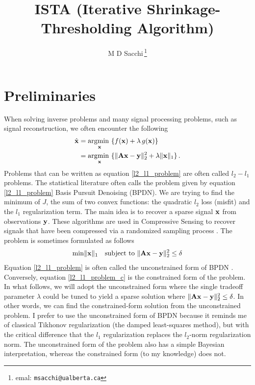 \documentclass[11pt, oneside]{article}  	%
\title{ISTA (Iterative Shrinkage-Thresholding Algorithm) }
\author{M D Sacchi\,\footnote{emal: \texttt{msacchi@ualberta.ca}} }
\date{}
\def\be{\vspace{0.0cm}\begin{equation}}
\def\ee{\vspace{0.0cm}\end{equation}}
\def\nin{\noindent}
\begin{document}
\maketitle

\section{Preliminaries}
When solving inverse problems and many signal processing problems, such as signal reconstruction, we often encounter the following 
\begin{align}
\hat{{\bf x }} &= \underset{{\bf x}}{\mbox{argmin }} \{ f({\bf x}) + \lambda\, g({\bf x}) \} \nonumber\\
      &= \underset{{\bf x}}{\mbox{argmin }} \{ \| {\bf A} {\bf x} - {\bf y} \|_2^2 + \lambda \| {\bf x} \|_1 \} \,.\label{l2_l1_problem}
\end{align}
Problems that can be written as equation \ref{l2_l1_problem} are often called $l_2-l_1$ problems. The statistical literature often calls the problem given by equation \ref{l2_l1_problem}  Basis Pursuit Denoising (BPDN). We are trying to find the minimum of $J$, the sum of two convex functions: the quadratic $l_2$ loss (misfit) and the $l_1$ regularization term. The main idea is to recover a sparse signal $\bf x$ from observations $\bf y$. These algorithms are used in Compressive Sensing to recover signals that have been compressed via a randomized sampling process  \citep{CS_Tutorial}. The problem is sometimes formulated as follows
\be
\mbox{min} \| {\bf x} \|_1 \quad \mbox{subject to } \| {\bf A} {\bf x} -{\bf y} \|_2^2 \le \delta 
 \label{l2_l1_problem_c}
\ee
\nin
Equation \ref{l2_l1_problem} is often called the unconstrained form of BPDN \citep{BPDN}. Conversely, equation \ref{l2_l1_problem_c} is
the constrained form of the problem. In what follows, we will adopt the unconstrained form where the single
tradeoff parameter $\lambda$ could be tuned to yield a sparse solution where $\| {\bf A} {\bf x} -{\bf y} \|_2^2 \le \delta $. In other words, we can find the constrained-form solution from the unconstrained problem. I prefer to use the unconstrained form of BPDN because it reminds me of classical Tikhonov regularization (the damped least-squares method), but with the critical difference that the $l_1$ regularization replaces the $l_2$-norm regularization norm. The unconstrained form of the problem also has a simple Bayesian
interpretation, whereas the constrained form (to my knowledge) does not.  
\end{document}
